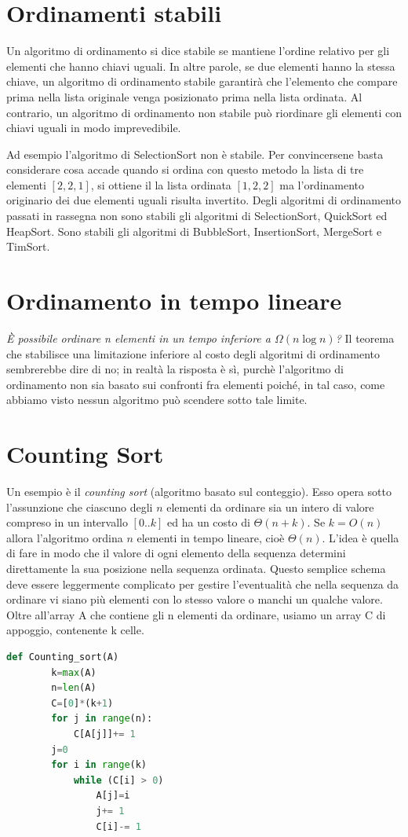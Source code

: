 \section*{Ordinamenti stabili}
Un algoritmo di ordinamento si dice stabile se mantiene l'ordine relativo per gli elementi che hanno chiavi uguali. In altre parole, se due elementi hanno la stessa chiave, un algoritmo di ordinamento stabile garantirà che l'elemento che compare prima nella lista originale venga posizionato prima nella lista ordinata. Al contrario, un algoritmo di ordinamento non stabile può riordinare gli elementi con chiavi uguali in modo imprevedibile.

Ad esempio l'algoritmo di SelectionSort non è stabile. Per convincersene basta considerare cosa accade quando si ordina con questo metodo la lista di tre elementi $[2,2,1]$, si ottiene il la lista ordinata $[1,2,2]$ ma l'ordinamento originario dei due elementi uguali risulta invertito. Degli algoritmi di ordinamento passati in rassegna non sono stabili gli algoritmi di SelectionSort, QuickSort ed HeapSort. Sono stabili gli algoritmi di BubbleSort, InsertionSort, MergeSort e TimSort. 

\section*{Ordinamento in tempo lineare}
\textit{È possibile ordinare n elementi in un tempo inferiore a $\Omega(n\log n)$?}
Il teorema che stabilisce una limitazione inferiore al costo degli algoritmi di ordinamento sembrerebbe dire di no; in realtà la risposta è sì, purchè l’algoritmo di ordinamento non sia basato sui confronti fra elementi poiché, in tal caso, come abbiamo visto nessun algoritmo può scendere sotto tale limite.

\section{Counting Sort}
Un esempio è il \textit{counting sort} (algoritmo basato sul conteggio). Esso opera sotto l’assunzione che ciascuno degli $n$ elementi da ordinare sia un intero di valore compreso in un intervallo $[0..k]$ ed ha un costo di $\Theta(n+k)$. Se $k = O(n)$ allora l’algoritmo ordina $n$ elementi in tempo lineare, cioè $\Theta(n)$. L’idea è quella di fare in modo che il valore di ogni elemento della sequenza
determini direttamente la sua posizione nella sequenza ordinata. Questo semplice schema deve essere leggermente complicato per gestire l’eventualità che nella sequenza da ordinare vi siano più elementi con lo stesso valore o manchi un qualche valore.
Oltre all’array A che contiene gli n elementi da ordinare, usiamo un array C di appoggio, contenente k celle.
\begin{lstlisting}[language=Python]
    def Counting_sort(A)
        k=max(A)
        n=len(A)
        C=[0]*(k+1)
        for j in range(n):
            C[A[j]]+= 1
        j=0
        for i in range(k)
            while (C[i] > 0)
                A[j]=i
                j+= 1
                C[i]-= 1
\end{lstlisting}


